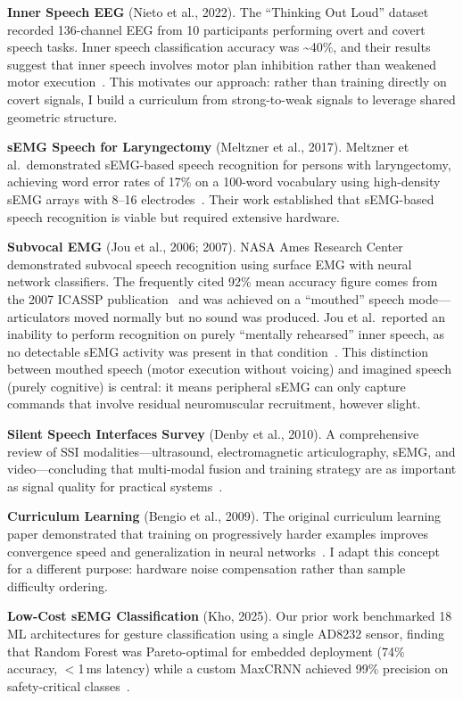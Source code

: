 \documentclass[11pt, a4paper]{article}
\begin{document}
\textbf{Inner Speech EEG} (Nieto et al., 2022). The ``Thinking Out Loud'' dataset recorded 136-channel EEG from 10 participants performing overt and covert speech tasks. Inner speech classification accuracy was \textasciitilde40\%, and their results suggest that inner speech involves motor plan inhibition rather than weakened motor execution~\cite{nieto2022}. This motivates our approach: rather than training directly on covert signals, I build a curriculum from strong-to-weak signals to leverage shared geometric structure.

\textbf{sEMG Speech for Laryngectomy} (Meltzner et al., 2017). Meltzner et al.\ demonstrated sEMG-based speech recognition for persons with laryngectomy, achieving word error rates of 17\% on a 100-word vocabulary using high-density sEMG arrays with 8--16 electrodes~\cite{meltzner2017}. Their work established that sEMG-based speech recognition is viable but required extensive hardware.

\textbf{Subvocal EMG} (Jou et al., 2006; 2007). NASA Ames Research Center demonstrated subvocal speech recognition using surface EMG with neural network classifiers. The frequently cited 92\% mean accuracy figure comes from the 2007 ICASSP publication~\cite{jou2007} and was achieved on a ``mouthed'' speech mode---articulators moved normally but no sound was produced. Jou et al.\ reported an inability to perform recognition on purely ``mentally rehearsed'' inner speech, as no detectable sEMG activity was present in that condition~\cite{jou2006}. This distinction between mouthed speech (motor execution without voicing) and imagined speech (purely cognitive) is central: it means peripheral sEMG can only capture commands that involve residual neuromuscular recruitment, however slight.

\textbf{Silent Speech Interfaces Survey} (Denby et al., 2010). A comprehensive review of SSI modalities---ultrasound, electromagnetic articulography, sEMG, and video---concluding that multi-modal fusion and training strategy are as important as signal quality for practical systems~\cite{denby2010}.

\textbf{Curriculum Learning} (Bengio et al., 2009). The original curriculum learning paper demonstrated that training on progressively harder examples improves convergence speed and generalization in neural networks~\cite{bengio2009}. I adapt this concept for a different purpose: hardware noise compensation rather than sample difficulty ordering.

\textbf{Low-Cost sEMG Classification} (Kho, 2025). Our prior work benchmarked 18 ML architectures for gesture classification using a single AD8232 sensor, finding that Random Forest was Pareto-optimal for embedded deployment (74\% accuracy, $<$1\,ms latency) while a custom MaxCRNN achieved 99\% precision on safety-critical classes~\cite{kho2026prior}.
\end{document}
